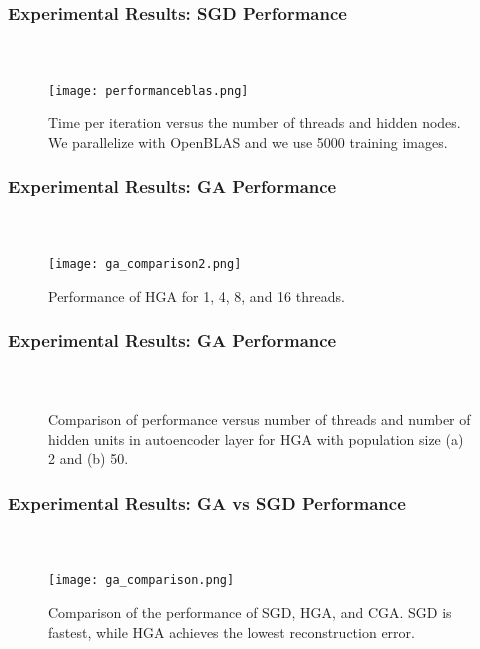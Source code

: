 \begin{frame}[t]
	\frametitle{Experimental Results: SGD Performance}
	\framesubtitle{~~}  %

	\begin{figure}[h]
		\centering
		\texttt{[image: performanceblas.png]}
		\caption{Time per iteration versus the number of threads and hidden nodes. We parallelize with OpenBLAS and we use 5000 training images.}
		\label{fig:performanceblas}
	\end{figure}

\end{frame}


\begin{frame}[t]
	\frametitle{Experimental Results: GA Performance}
	\framesubtitle{~~}  %

	\begin{figure}[h] \centering
		\texttt{[image: ga\_comparison2.png]}
		\caption{Performance of HGA for 1, 4, 8, and 16 threads.}
		\label{fig:ga_comparison2}
	\end{figure}


\end{frame}


\begin{frame}[t]
	\frametitle{Experimental Results: GA Performance}
	\framesubtitle{~~}  %

\begin{figure}[H]
  \centering
  \caption{Comparison of performance versus number of threads and number of hidden units in autoencoder layer for HGA with population size (a) 2 and (b) 50.}
  \label{fig:ga_comparison3}
\end{figure}


\end{frame}


\begin{frame}[t]
	\frametitle{Experimental Results: GA vs SGD Performance}
	\framesubtitle{~~}  %

\begin{figure}[h] \centering
  \texttt{[image: ga\_comparison.png]}
  \caption{Comparison of the performance of SGD, HGA, and CGA. SGD is fastest, while HGA achieves the lowest reconstruction error.}
  \label{fig:ga_comparison}
\end{figure}

\end{frame}
